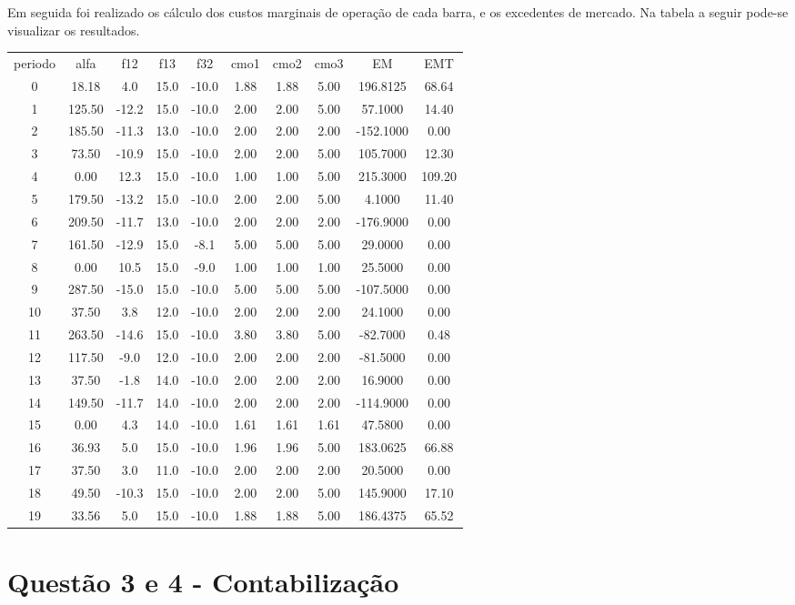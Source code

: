 \documentclass[a4paper,12pt,twoside]{article}
\begin{document}
Em seguida foi realizado os cálculo dos custos marginais de operação de cada barra,
e os excedentes de mercado.
Na tabela a seguir pode-se visualizar os resultados.

\begin{center}
    \begin{tabular}{ c c c c c c c c c c }
        periodo & alfa   & f12   & f13   & f32  & cmo1  & cmo2  & cmo3        & EM     & EMT \\
        0    & 18.18   & 4.0  & 15.0 & -10.0  & 1.88  & 1.88  & 5.00  & 196.8125   & 68.64 \\
        1   & 125.50 & -12.2  & 15.0 & -10.0  & 2.00  & 2.00  & 5.00   & 57.1000   & 14.40 \\
        2   & 185.50 & -11.3  & 13.0 & -10.0  & 2.00  & 2.00  & 2.00 & -152.1000    & 0.00 \\
        3    & 73.50 & -10.9  & 15.0 & -10.0  & 2.00  & 2.00  & 5.00  & 105.7000   & 12.30 \\
        4     & 0.00  & 12.3  & 15.0 & -10.0  & 1.00  & 1.00  & 5.00  & 215.3000  & 109.20 \\
        5   & 179.50 & -13.2  & 15.0 & -10.0  & 2.00  & 2.00  & 5.00    & 4.1000   & 11.40 \\
        6   & 209.50 & -11.7  & 13.0 & -10.0  & 2.00  & 2.00  & 2.00 & -176.9000    & 0.00 \\
        7   & 161.50 & -12.9  & 15.0  & -8.1  & 5.00  & 5.00  & 5.00   & 29.0000    & 0.00 \\
        8     & 0.00  & 10.5  & 15.0  & -9.0  & 1.00  & 1.00  & 1.00   & 25.5000    & 0.00 \\
        9   & 287.50 & -15.0  & 15.0 & -10.0  & 5.00  & 5.00  & 5.00 & -107.5000    & 0.00 \\
        10   & 37.50   & 3.8  & 12.0 & -10.0  & 2.00  & 2.00  & 2.00   & 24.1000    & 0.00 \\
        11  & 263.50 & -14.6  & 15.0 & -10.0  & 3.80  & 3.80  & 5.00  & -82.7000    & 0.48 \\
        12  & 117.50  & -9.0  & 12.0 & -10.0  & 2.00  & 2.00  & 2.00  & -81.5000    & 0.00 \\
        13   & 37.50  & -1.8  & 14.0 & -10.0  & 2.00  & 2.00  & 2.00   & 16.9000    & 0.00 \\
        14  & 149.50 & -11.7  & 14.0 & -10.0  & 2.00  & 2.00  & 2.00 & -114.9000    & 0.00 \\
        15    & 0.00   & 4.3  & 14.0 & -10.0  & 1.61  & 1.61  & 1.61   & 47.5800    & 0.00 \\
        16   & 36.93   & 5.0  & 15.0 & -10.0  & 1.96  & 1.96  & 5.00  & 183.0625   & 66.88 \\
        17   & 37.50   & 3.0  & 11.0 & -10.0  & 2.00  & 2.00  & 2.00   & 20.5000    & 0.00 \\
        18   & 49.50 & -10.3  & 15.0 & -10.0  & 2.00  & 2.00  & 5.00  & 145.9000   & 17.10 \\
        19   & 33.56   & 5.0  & 15.0 & -10.0  & 1.88  & 1.88  & 5.00  & 186.4375   & 65.52
    \end{tabular}
\end{center}


\newpage

\section{Questão 3 e 4 - Contabilização}
\end{document}
